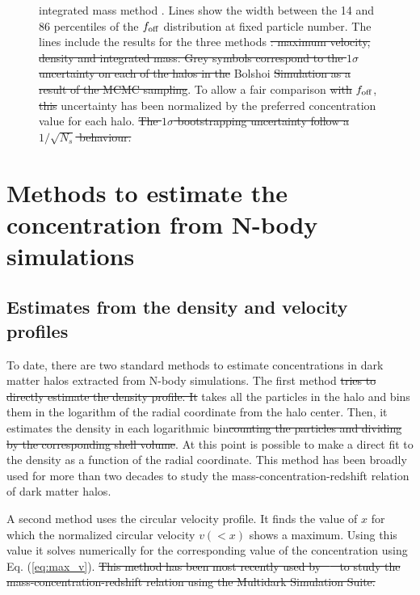 \documentclass{emulateapj}
\providecommand{\DIFadd}[1]{{\protect\color{blue}\uwave{#1}}} %
\providecommand{\DIFdel}[1]{{\protect\color{red}\sout{#1}}}                      %
\providecommand{\DIFdelbegin}{} %
\providecommand{\DIFdelend}{} %
\providecommand{\DIFaddFL}[1]{\DIFadd{#1}} %
\providecommand{\DIFdelFL}[1]{\DIFdel{#1}} %
\providecommand{\DIFaddbeginFL}{} %
\providecommand{\DIFaddendFL}{} %
\providecommand{\DIFdelbeginFL}{} %
\providecommand{\DIFdelendFL}{} %
\begin{document}
\begin{figure}
{  integrated mass method \DIFaddbeginFL \DIFaddFL{(circles)}\DIFaddendFL .   
  Lines show the width between the 14 and 86 percentiles
  of the $f_{\rm off}$ distribution at fixed particle number. 
  The lines include the results for the three methods \DIFdelbeginFL \DIFdelFL{: maximum
  velocity, density and integrated mass.
  Grey symbols correspond to the $1\sigma$ uncertainty on each of
  the halos in the }\DIFdelendFL \DIFaddbeginFL \DIFaddFL{using }\DIFaddendFL Bolshoi \DIFdelbeginFL \DIFdelFL{Simulation as a result of the MCMC
  sampling}\DIFdelendFL \DIFaddbeginFL \DIFaddFL{data}\DIFaddendFL .
  To allow a fair comparison \DIFdelbeginFL \DIFdelFL{with }\DIFdelendFL \DIFaddbeginFL \DIFaddFL{agains }\DIFaddendFL $f_{\rm off}$, \DIFdelbeginFL \DIFdelFL{this }\DIFdelendFL \DIFaddbeginFL \DIFaddFL{the MCMC }\DIFaddendFL uncertainty has
  been normalized by the preferred concentration value for each halo. 
  \DIFdelbeginFL \DIFdelFL{The $1\sigma$ bootstrapping uncertainty follow a $1/\sqrt{N_s}$
  behaviour. 
  }\DIFdelendFL \label{fig:downsampling}}
\end{figure}



\section{Methods to estimate the concentration from N-body simulations}
\label{sec:method}

\subsection{Estimates from the density and velocity profiles}

To date, there are two standard methods to estimate concentrations in
dark matter halos extracted from N-body simulations.  The first method
\DIFdelbegin \DIFdel{tries to directly estimate the density profile.  It }\DIFdelend takes all the particles in the halo and bins them in the logarithm of
the radial coordinate from the halo center.  Then, it estimates the
density in each logarithmic bin\DIFdelbegin \DIFdel{counting the particles and dividing by the
corresponding shell volume}\DIFdelend .  At this point is possible to make a
direct fit to the density as a function of the radial coordinate.
This method has been broadly used for more than two decades to study
the mass-concentration-redshift relation of dark matter halos. 
\DIFdelbegin %

\DIFdelend A second method uses the circular velocity profile.  It finds the
value of $x$ for which the normalized circular velocity $v(<x)$ shows
a maximum.  Using this value it solves numerically for the
corresponding value of the concentration using Eq. (\ref{eq:max_v}). 
\DIFdelbegin \DIFdel{This method has been most recently used by \mbox{%
\cite{Klypin2016}
}%
to study
the mass-concentration-redshift relation using the Multidark
Simulation Suite.
}\DIFdelend 
\end{document}
